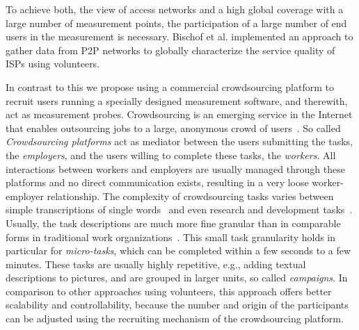 To achieve both, the view of access networks and a high global coverage with a large number of measurement points, the participation of a large number of end users in the measurement is necessary.
Bischof et al. \cite{bischof2011crowdsourcing} implemented an approach to gather data from P2P networks to globally characterize the service quality of ISPs using volunteers.

In contrast to this we propose using a commercial crowdsourcing platform to recruit users running a specially designed measurement software, and therewith, act as measurement probes.
Crowdsourcing is an emerging service in the Internet that enables outsourcing jobs to a large, anonymous crowd of users~\cite{articles2013-113}.
So called \emph{Crowdsourcing platforms} act as mediator between the users submitting the tasks, the \emph{employers}, and the users willing to complete these tasks, the \emph{workers}.
All interactions between workers and employers are usually managed through these platforms and no direct communication exists, resulting in a very loose worker-employer relationship.
The complexity of crowdsourcing tasks varies between simple transcriptions of single words~\cite{vonAhn2008} and even research and development tasks~\cite{innocentive}.
Usually, the task descriptions are much more fine granular than in comparable forms in traditional work organizations~\cite{conf2011-417}.
This small task granularity holds in particular for \emph{micro-tasks}, which can be completed within a few seconds to a few minutes.
These tasks are usually highly repetitive, e.g., adding textual descriptions to pictures, and are grouped in larger units, so called \emph{campaigns}.
In comparison to other approaches using volunteers, this approach offers better scalability and controllability, because the number and origin of the participants can be adjusted using the recruiting mechanism of the crowdsourcing platform.
